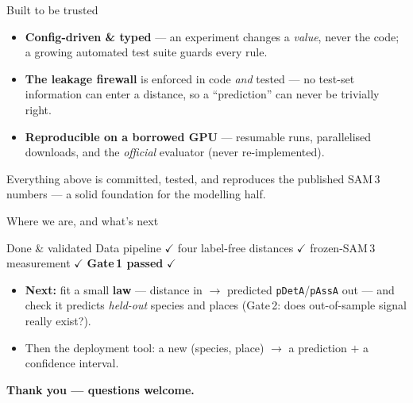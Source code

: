 \documentclass[aspectratio=169,11pt]{beamer}
\newcommand{\ck}{{\color{forest}$\checkmark$}}
\begin{document}
\begin{frame}{Built to be trusted}
  \begin{itemize}
    \item \textbf{Config-driven \& typed} --- an experiment changes a \emph{value}, never the code; a
          growing automated test suite guards every rule.
    \item \textbf{The leakage firewall} is enforced in code \emph{and} tested --- no test-set information
          can enter a distance, so a ``prediction'' can never be trivially right.
    \item \textbf{Reproducible on a borrowed GPU} --- resumable runs, parallelised downloads, and the
          \emph{official} evaluator (never re-implemented).
  \end{itemize}
  \vspace{0.3em}
  \begin{block}{}
    \centering\footnotesize Everything above is committed, tested, and reproduces the published SAM\,3
    numbers --- a solid foundation for the modelling half.
  \end{block}
\end{frame}

\begin{frame}{Where we are, and what's next}
  \begin{block}{Done \& validated}
    \centering\footnotesize
    Data pipeline \ck\;\; four label-free distances \ck\;\; frozen-SAM\,3 measurement \ck\;\;
    \textbf{Gate\,1 passed} \ck
  \end{block}
  \vspace{0.5em}
  \begin{itemize}
    \item \textcolor{burnt}{\textbf{Next:}} fit a small \textbf{law} --- distance in $\to$ predicted
          \texttt{pDetA}/\texttt{pAssA} out --- and check it predicts \emph{held-out} species and places
          (Gate\,2: does out-of-sample signal really exist?).
    \item Then the deployment tool: a new (species, place) $\to$ a prediction $+$ a confidence interval.
  \end{itemize}
  \vspace{0.4em}
  \centering\small\color{navy}\textbf{Thank you --- questions welcome.}
\end{frame}
\end{document}
